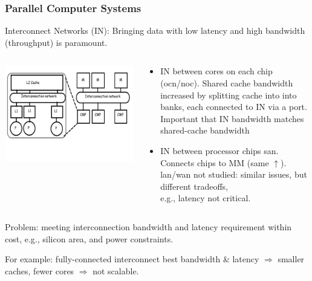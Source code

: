 \documentclass{beamer}
\renewcommand{\emph}[1]{\textcolor{structure}{#1}}
\newcommand{\emp}[1]{\textcolor{DikuRed}{ #1}}
\begin{document}
\begin{frame}[fragile,t]
\frametitle{Parallel Computer Systems}

\emp{Interconnect Networks (IN)}: 
Bringing data with low latency and high bandwidth (throughput) is paramount.


\begin{columns}
\includegraphics[width=44ex]{FigsInterconnect/ParSys}\pause
{}
\vspace{-6ex}
\begin{scriptsize}
\begin{itemize}
    \item \emp{IN between cores on each chip ({\sc ocn}/{\sc noc})}. 
            Shared cache bandwidth increased by splitting  
                    cache into into banks, 
                each connected to IN via a port.
            \emph{Important that IN bandwidth matches shared-cache bandwidth}
    \item \emp{IN between processor chips {\sc san}.}
            Connects chips to MM (same $\uparrow$).
            {\sc lan}/{\sc wan} not studied: similar issues,
            but different tradeoffs,\\e.g., latency not critical.
\end  {itemize}
\end{scriptsize}
\end{columns}
\vspace{-4ex}

\alert{Problem}: meeting interconnection bandwidth and latency requirement
within cost, e.g., silicon area, and power constraints.
\medskip\pause

For example: fully-connected interconnect best bandwidth \& latency
$\Rightarrow$ smaller caches, fewer cores $\Rightarrow$ not scalable.

\end{frame}
\end{document}

